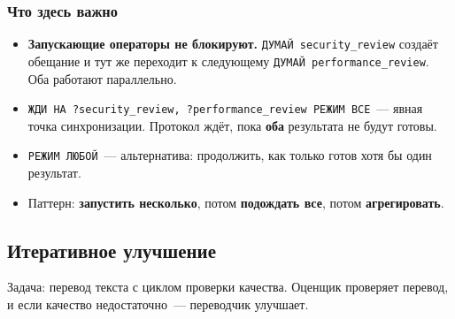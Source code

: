 \documentclass[11pt,a4paper]{article}
\newcommand{\ic}[1]{\texttt{\small #1}}
\begin{document}
\subsubsection{Что здесь важно}

\begin{itemize}[leftmargin=2em]
\item \textbf{Запускающие операторы не блокируют.} \ic{ДУМАЙ security\_review} создаёт обещание и тут же переходит к следующему \ic{ДУМАЙ performance\_review}. Оба работают параллельно.

\item \ic{ЖДИ НА ?security\_review, ?performance\_review РЕЖИМ ВСЕ}~--- явная точка синхронизации. Протокол ждёт, пока \textbf{оба} результата не будут готовы.

\item \ic{РЕЖИМ ЛЮБОЙ}~--- альтернатива: продолжить, как только готов хотя бы один результат.

\item Паттерн: \textbf{запустить несколько}, потом \textbf{подождать все}, потом \textbf{агрегировать}.
\end{itemize}

\subsection{Итеративное улучшение}

Задача: перевод текста с циклом проверки качества. Оценщик проверяет перевод, и если качество недостаточно~--- переводчик улучшает.
\end{document}
